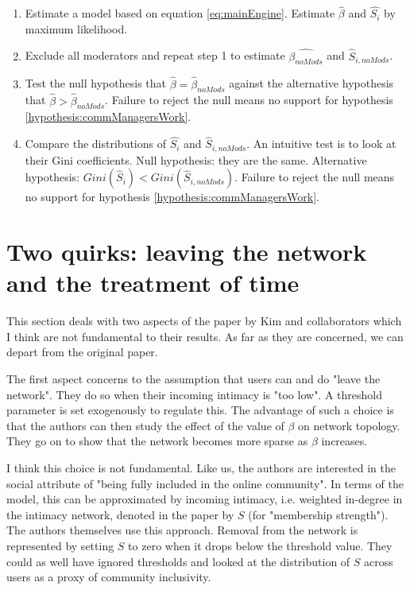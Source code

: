 \documentclass{article}
\begin{document}
\begin{enumerate}
	\item Estimate a model based on equation \ref{eq:mainEngine}. Estimate $\hat{\beta}$ and $\hat{S_i}$ by maximum likelihood. 
	\item Exclude all moderators and repeat step 1 to estimate $\hat{\beta_{noMods}}$ and $\hat{S}_{i, noMods}$.
	\item Test the null hypothesis that $\hat{\beta} = \hat{\beta}_{noMods}$ against the alternative hypothesis that $\hat{\beta} > \hat{\beta}_{noMods}$. Failure to reject the null means no support for hypothesis \ref{hypothesis:commManagersWork}.
	\item Compare the distributions of $\hat{S_i}$ and $\hat{S}_{i, noMods}$. An intuitive test is to look at their Gini coefficients. Null hypothesis: they are the same. Alternative hypothesis:  $Gini(\hat{S}_i) < Gini(\hat{S}_{i, noMods})$. Failure to reject the null means no support for hypothesis \ref{hypothesis:commManagersWork}.

\end{enumerate} 

\section{Two quirks: leaving the network and the treatment of time}

This section deals with two aspects of the paper by Kim and collaborators which I think are not fundamental to their results. As far as they are concerned, we can depart from the original paper.

The first aspect concerns to the assumption that users can and do "leave the network". They do so when their incoming intimacy is "too low". A threshold parameter is set exogenously to regulate this. The advantage of such a choice is that the authors can then study the effect of the value of $\beta$ on network topology. They go on to show that the network becomes more sparse as $\beta$ increases.

I think this choice is not fundamental. Like us, the authors are interested in the social attribute of "being fully included in the online community". In terms of the model, this can be approximated by incoming intimacy, i.e. weighted in-degree in the intimacy network, denoted in the paper by $S$ (for "membership strength"). The authors themselves use this approach. Removal from the network is represented by setting $S$ to zero when it drops below the threshold value. They could as well have ignored thresholds and looked at the distribution of $S$ across users as a proxy of community inclusivity. 
\end{document}
